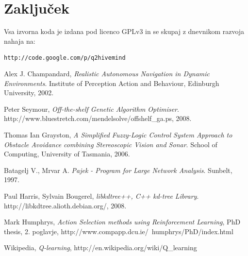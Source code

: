 \documentclass[a4paper,10pt]{article}
\begin{document}
\section{Zaključek}

Vsa izvorna koda je izdana pod licenco GPLv3 in se skupaj z dnevnikom razvoja nahaja na:

\begin{center}
\texttt{http://code.google.com/p/q2hivemind}
\end{center}

%
%
\begin{thebibliography}{9}

  Alex J. Champandard,
  \emph{Realistic Autonomous Navigation in Dynamic Environments}.
  Institute of Perception Action and Behaviour,
  Edinburgh University,
  2002.

  Peter Seymour,
  \emph{Off-the-shelf Genetic Algorithm Optimiser}.
  http://www.bluestretch.com/mendelsolve/offshelf\_ga.ps,
  2008.

  Thomas Ian Grayston,
  \emph{A Simplified Fuzzy-Logic Control System Approach to Obstacle Avoidance combining Stereoscopic Vision and Sonar}.
  School of Computing,
  University of Tasmania,
  2006.

  Batagelj V., Mrvar A.
  \emph{Pajek - Program for Large Network Analysis}.
  Sunbelt,
  1997.

  Paul Harris, Sylvain Bougerel,
  \emph{libkdtree++, C++ kd-tree Library}.
  http://libkdtree.alioth.debian.org/,
  2008.

  Mark Humphrys,
  \emph{Action Selection methods using Reinforcement Learning},
  PhD thesis, 2. poglavje,
  http://www.compapp.dcu.ie/~humphrys/PhD/index.html

  Wikipedia,
  \emph{Q-learning},
  http://en.wikipedia.org/wiki/Q\_learning

\end{thebibliography}
\end{document}
